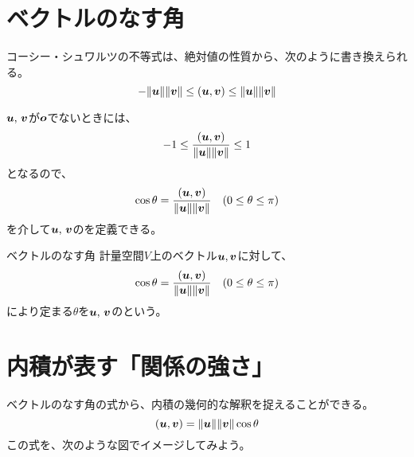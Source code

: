 \documentclass[../../../topic_linear-algebra]{subfiles}
\begin{document}
\sectionline
\section{ベクトルのなす角}

コーシー・シュワルツの不等式は、絶対値の性質から、次のように書き換えられる。
\begin{equation*}
  - \| \vb*{u} \| \| \vb*{v} \| \leq (\vb*{u}, \vb*{v}) \leq \| \vb*{u} \| \| \vb*{v} \|
\end{equation*}

$\vb*{u},\,\vb*{v}$が$\vb*{o}$でないときには、
\begin{equation*}
  -1 \leq \frac{(\vb*{u}, \vb*{v})}{\|\vb*{u}\| \|\vb*{v}\|} \leq 1
\end{equation*}
となるので、
\begin{equation*}
  \cos \theta = \frac{(\vb*{u}, \vb*{v})}{\|\vb*{u}\| \|\vb*{v}\|} \quad (0 \leq \theta \leq \pi)
\end{equation*}
を介して$\vb*{u},\,\vb*{v}$のを定義できる。

\begin{definition}{ベクトルのなす角}
  計量空間$V$上のベクトル$\vb*{u},\vb*{v}$に対して、
  \begin{equation*}
    \cos \theta = \frac{(\vb*{u}, \vb*{v})}{\|\vb*{u}\| \|\vb*{v}\|} \quad (0 \leq \theta \leq \pi)
  \end{equation*}
  により定まる$\theta$を$\vb*{u},\,\vb*{v}$のという。
\end{definition}

\sectionline
\section{内積が表す「関係の強さ」}

ベクトルのなす角の式から、内積の幾何的な解釈を捉えることができる。
\begin{equation*}
  (\vb*{u}, \vb*{v}) = \| \vb*{u} \| \| \vb*{v} \| \cos \theta
\end{equation*}
この式を、次のような図でイメージしてみよう。
\end{document}
